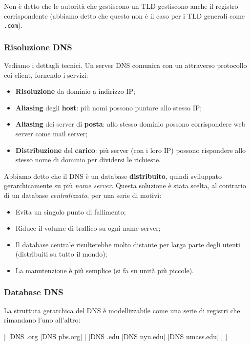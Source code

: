 \documentclass[a4paper,11pt]{article}
\begin{document}
Non è detto che le autorità che gestiscono un TLD gestiscono anche il registro corrispondente (abbiamo detto che questo non è il caso per i TLD generali come \lstinline|.com|).

\subsubsection{Risoluzione DNS}
Vediamo i dettagli tecnici.
Un server DNS comunica con un attraverso protocollo coi client, fornendo i servizi:
\begin{itemize}
	\item \textbf{Risoluzione} da dominio a indirizzo IP;
	\item \textbf{Aliasing} degli \textbf{host}: più nomi possono puntare allo stesso IP;
	\item \textbf{Aliasing} dei server di \textbf{posta}: allo stesso dominio possono corrispondere web server come mail server;
	\item \textbf{Distribuzione} del \textbf{carico}: più server (con i loro IP) possono rispondere allo stesso nome di dominio per dividersi le richieste.
\end{itemize}

Abbiamo detto che il DNS è un database \textbf{distribuito}, quindi sviluppato gerarchicamente su più \textit{name server}.
Questa soluzione è stata scelta, al contrario di un database \textit{centralizzato}, per una serie di motivi:
\begin{itemize}
	\item Evita un singolo punto di fallimento;
	\item Riduce il volume di traffico su ogni name server;
	\item Il database centrale risulterebbe molto distante per larga parte degli utenti (distribuiti su tutto il mondo);
	\item La manutenzione è più semplice (si fa su unità più piccole).
\end{itemize}

\subsubsection{Database DNS}
La struttura gerarchica del DNS è modellizzabile come una serie di registri che rimandano l'uno all'altro:
\begin{center}
	\begin{forest}
		[DNS Root, rectstyle
		[DNS .com
			[DNS yahoo.com]
			[DNS google.com]
		]
		[DNS .org
			[DNS pbs.org]
		]
		[DNS .edu
			[DNS nyu.edu]
			[DNS umass.edu]
		]
		]	
	\end{forest}
\end{center}
\end{document}
